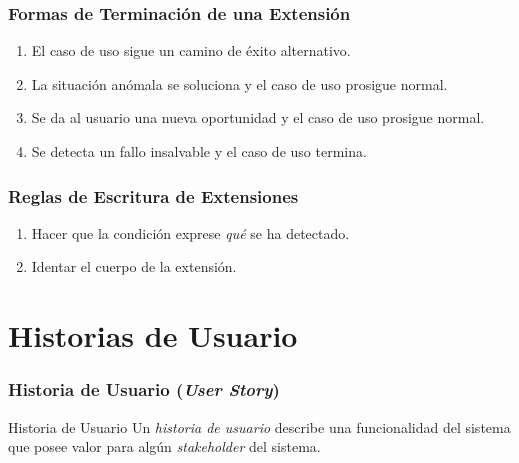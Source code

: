 \documentclass[handout,slidestop,xcolor=pst,dvips,blue]{beamer}
\begin{document}
\begin{frame}[c]
    \frametitle{Formas de Terminación de una Extensión}
    \begin{enumerate}[<+->]
        \item El caso de uso sigue un camino de éxito alternativo.
        \item La situación anómala se soluciona y el caso de uso prosigue normal.
        \item Se da al usuario una nueva oportunidad y el caso de uso prosigue normal.
        \item Se detecta un fallo insalvable y el caso de uso termina.
     \end{enumerate}
\end{frame}

\begin{frame}[c]
    \frametitle{Reglas de Escritura de Extensiones}
    \begin{enumerate}[<+->]
        \item Hacer que la condición exprese \alert{\emph{qué}} se ha detectado.
        \item Identar el cuerpo de la extensión.
    \end{enumerate}
\end{frame}

\section{Historias de Usuario}

\begin{frame}[c]
	\frametitle{Historia de Usuario (\emph{User Story})}
	\begin{block}{Historia de Usuario}
        Un \emph{historia de usuario} describe una funcionalidad del sistema que posee valor para algún \emph{stakeholder} del sistema.
	\end{block}
\end{frame}
\end{document}
